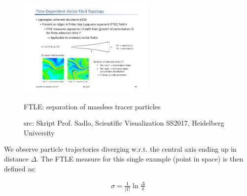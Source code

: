 \documentclass{scrartcl}
\begin{document}
\begin{figure}[!t]
  \centering
 {
    \includegraphics[width=0.6\textwidth]
    {img/ftle_sep.pdf}
  }
  \caption{FTLE: separation of massless tracer particles}
  \caption*{src: Skript Prof. Sadlo, Scientific Visualization SS2017, Heidelberg University}
  \label{ftle_sep}
\end{figure}

We observe particle trajectories diverging w.r.t. the central axis ending up in distance $\Delta$. The FTLE measure for this single example (point in space) is then defined as:

\begin{align*}
	\sigma = \frac{1}{\lvert T\rvert}\ln \frac{\Delta}{\delta}
\end{align*}
\end{document}

